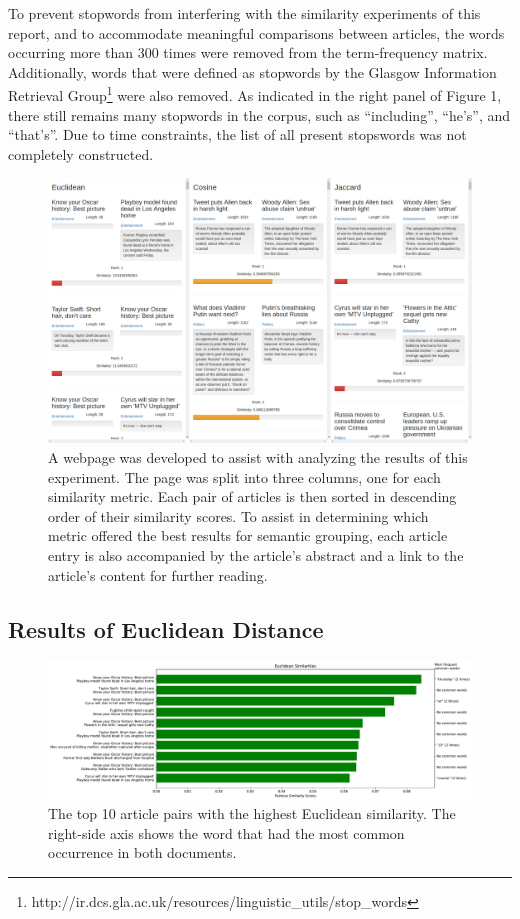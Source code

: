 \documentclass[11pt]{article}
\begin{document}
To prevent stopwords from interfering with the similarity experiments of this report, and to accommodate meaningful comparisons between articles, the words occurring more than 300 times were removed from the term-frequency matrix.
Additionally, words that were defined as stopwords by the Glasgow Information
Retrieval Group\footnote{http://ir.dcs.gla.ac.uk/resources/linguistic\_utils/stop\_words} were also removed.
As indicated in the right panel of Figure 1, there still remains many stopwords in the corpus, such as ``including'', ``he's'', and ``that's''.
Due to time constraints, the list of all present stopswords was not completely constructed.


\begin{figure}[h] \label{fig:website}
  \centering
  \includegraphics[width=\textwidth]{figures/webpage}
  \caption{A webpage was developed to assist with analyzing the results of this experiment.
  The page was split into three columns, one for each similarity metric.
  Each pair of articles is then sorted in descending order of their similarity scores.
  To assist in determining which metric offered the best results for semantic grouping, each article entry is also accompanied by the article's abstract and a link to the article's content for further reading.}
\end{figure}

\subsection{Results of Euclidean Distance}

\begin{figure}[h] \label{fig:euclid}
  \centering
  \includegraphics[width=\textwidth]{figures/euclidean_most_sim}
  \caption{The top 10 article pairs with the highest Euclidean similarity.
  The right-side axis shows the word that had the most common occurrence in both documents.}
\end{figure}
\end{document}
